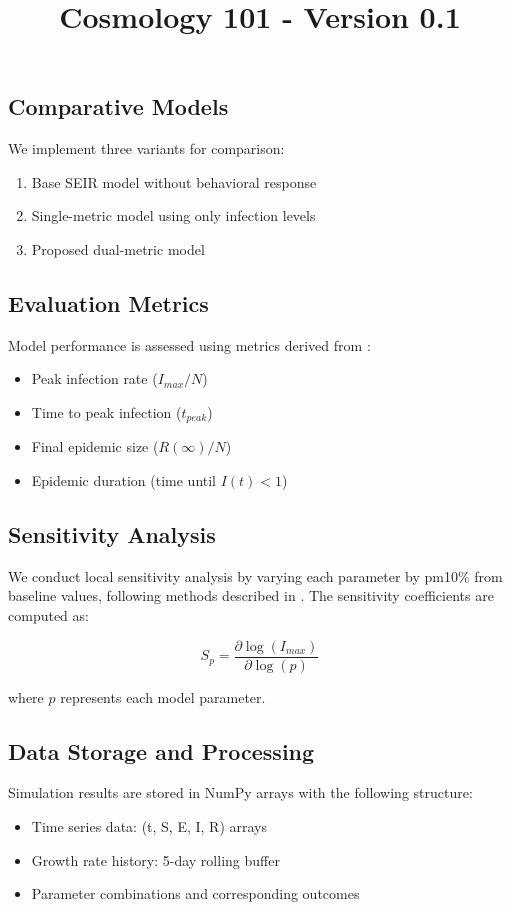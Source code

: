 \documentclass{article}\usepackage{graphicx} \usepackage{amsmath} \usepackage{colortbl}\title{Cosmology 101 - Version 0.1}
\begin{document}
\subsection{Comparative Models}
We implement three variants for comparison:
\begin{enumerate}
\item Base SEIR model without behavioral response
\item Single-metric model using only infection levels
\item Proposed dual-metric model
\end{enumerate}

\subsection{Evaluation Metrics}
Model performance is assessed using metrics derived from \cite{anderson1992infectious}:
\begin{itemize}
\item Peak infection rate ($I_{max}/N$)
\item Time to peak infection ($t_{peak}$)
\item Final epidemic size ($R(\infty)/N$)
\item Epidemic duration (time until $I(t) < 1$)
\end{itemize}

\subsection{Sensitivity Analysis}
We conduct local sensitivity analysis by varying each parameter by pm10\% from baseline values, following methods described in \cite{hethcote2000mathematics}. The sensitivity coefficients are computed as:

\begin{equation}
S_p = \frac{\partial \log(I_{max})}{\partial \log(p)}
\end{equation}

where $p$ represents each model parameter.

\subsection{Data Storage and Processing}
Simulation results are stored in NumPy arrays with the following structure:
\begin{itemize}
\item Time series data: (t, S, E, I, R) arrays
\item Growth rate history: 5-day rolling buffer
\item Parameter combinations and corresponding outcomes
\end{itemize}
\end{document}
